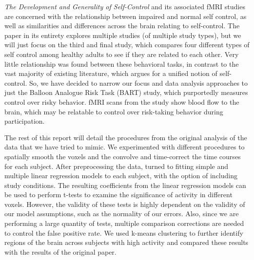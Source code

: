 \par \textit{The Development and Generality of Self-Control} \cite
{CohenSelfControl} and its associated fMRI studies are concerned with the 
relationship between impaired and normal self control, as well as 
similarities and differences across the brain relating to self-control. The 
paper in its entirety explores multiple studies (of multiple study types), 
but we will just focus on the third and final study, which compares four 
different types of self control among healthy adults to see if they are 
related to each other. Very little relationship was found between these 
behavioral tasks, in contrast to the vast majority of existing literature, 
which argues for a unified notion of self-control. So, we have decided to 
narrow our focus and data analysis approaches to just the Balloon Analogue 
Risk Task (BART) study, which purportedly measures control over risky 
behavior. fMRI scans from the study show blood flow to the brain, which may 
be relatable to control over risk-taking behavior during participation.

\par The rest of this report will detail the procedures from the original 
analysis of the data that we have tried to mimic. We experimented with 
different procedures to spatially smooth the voxels and the convolve and 
time-correct the time courses for each subject. After preprocessing the data, 
turned to fitting simple and multiple linear regression models to each subject, 
with the option of including study conditions. The resulting coefficients from 
the linear regression models can be used to perform t-tests to examine the 
significance of activity in different voxels. However, the validity of these 
tests is highly dependent on the validity of our model assumptions, such as the 
normality of our errors. Also, since we are performing a large quantity of tests, 
multiple comparison corrections are needed to control the false positive rate. 
We used k-means clustering to further identify regions of the brain across 
subjects with high activity and compared these results with the results of the 
original paper. 
